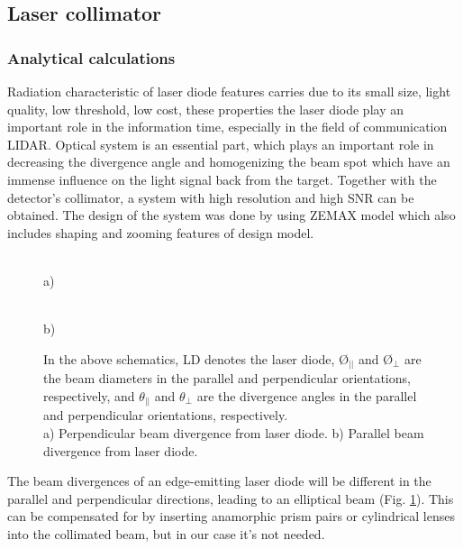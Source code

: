 \subsection{Laser collimator}
\subsubsection{Analytical calculations}

Radiation characteristic of laser diode features carries due to its small size, light
quality, low threshold, low cost, these properties the laser diode play an important role in the information time, especially in the field of communication LIDAR.
Optical system is an essential part, which plays an important role in decreasing the divergence angle and homogenizing the beam spot which have an immense
influence on the light signal back from the target.
Together with the detector's collimator, a system with high resolution and high SNR can be obtained.
The design of the system was done by using ZEMAX model which also includes shaping and zooming features of design model.

\begin{figure}[H]
\begin{minipage}[h]{0.52\linewidth}
 \\ a) 
\end{minipage}
\hfill
\begin{minipage}[h]{0.45\linewidth}
 \\ b)
\end{minipage}
\caption{
In the above schematics, LD denotes the laser diode, \O$_{||}$ and \O$_{\perp}$ are the beam diameters in the parallel and perpendicular orientations, respectively, and $\theta_{||}$
 and  $\theta_{\perp}$ are the divergence angles in the parallel and perpendicular orientations, respectively.\\
a) Perpendicular beam divergence from laser diode.
b) Parallel beam divergence from laser diode.
}
\label{fig:laser_beam}
\end{figure}

The beam divergences of an edge-emitting laser diode will be different in the parallel and perpendicular directions, leading to an elliptical beam (Fig. \ref{fig:laser_beam}).
This can be compensated for by inserting anamorphic prism pairs or cylindrical lenses into the collimated beam, but in our case it's not needed.

